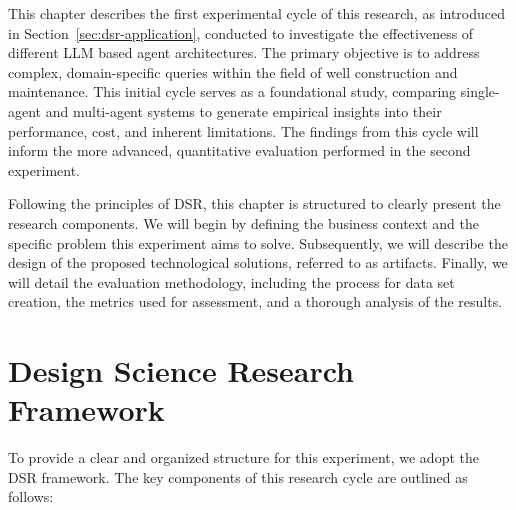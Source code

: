     This chapter describes the first experimental cycle of this research, as introduced in Section~\ref{sec:dsr-application}, conducted to investigate the effectiveness of different LLM based agent architectures. The primary objective is to address complex, domain-specific queries within the field of well construction and maintenance. This initial cycle serves as a foundational study, comparing single-agent and multi-agent systems to generate empirical insights into their performance, cost, and inherent limitations. The findings from this cycle will inform the more advanced, quantitative evaluation performed in the second experiment.

    Following the principles of DSR, this chapter is structured to clearly present the research components. We will begin by defining the business context and the specific problem this experiment aims to solve. Subsequently, we will describe the design of the proposed technological solutions, referred to as artifacts. Finally, we will detail the evaluation methodology, including the process for data set creation, the metrics used for assessment, and a thorough analysis of the results.
    
    \section{Design Science Research Framework}
    
        To provide a clear and organized structure for this experiment, we adopt the DSR framework. The key components of this research cycle are outlined as follows:

